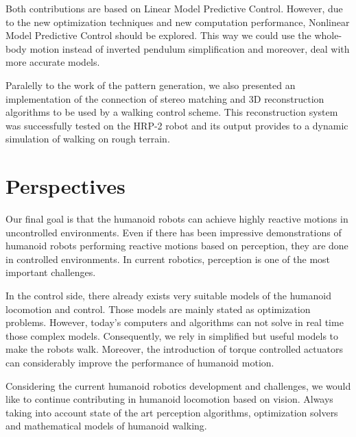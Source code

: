 Both contributions are based on Linear Model Predictive Control. However, due to the new optimization techniques and new computation performance, Nonlinear Model Predictive Control should be explored. This way we could use the whole-body motion instead of inverted pendulum simplification and moreover, deal with more accurate models.

Paralelly to the work of the pattern generation, we also presented an implementation of the connection of stereo matching and 3D reconstruction algorithms to be used by a walking control scheme. This reconstruction system was successfully tested on the HRP-2 robot and its output provides to a dynamic simulation of walking on rough terrain.

\section{Perspectives}

Our final goal is that the humanoid robots can achieve highly reactive motions in uncontrolled environments. Even if there has been impressive demonstrations of humanoid robots performing reactive motions based on perception, they are done in controlled environments. In current robotics, perception is one of the most important challenges.

In the control side, there already exists very suitable models of the humanoid locomotion and control. Those models are mainly stated as optimization problems. However, today's computers and algorithms can not solve in real time those complex models. Consequently, we rely in simplified but useful models to make the robots walk. Moreover, the introduction of torque controlled actuators can considerably improve the performance of humanoid motion.

Considering the current humanoid robotics development and challenges, we would like to continue contributing in humanoid locomotion based on vision. Always taking into account state of the art perception algorithms, optimization solvers and mathematical models of humanoid walking.

